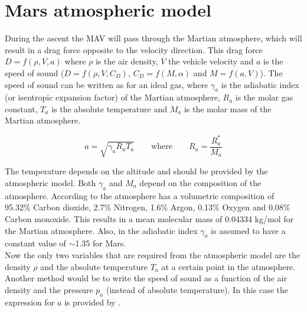 \chapter{Mars atmospheric model} %
\label{ch:mars-atm-mod}
During the ascent the \ac{MAV} will pass through the Martian atmosphere, which will result in a drag force opposite to the velocity direction. This drag force $D=f(\rho,V,a)$ where $\rho$ is the air density, $V$ the vehicle velocity and $a$ is the speed of sound ($D=f(\rho,V,C_{D})$, $C_{D}=f(M,\alpha)$ and $M=f(a,V)$). The speed of sound can be written as  for an ideal gas, where $\gamma_{a}$ is the adiabatic index (or isentropic expansion factor) of the Martian atmosphere, $R_{a}$ is the molar gas constant, $T_{a}$ is the absolute temperature and $M_{a}$ is the molar mass of the Martian atmosphere.


\begin{equation} \label{eq:speedofsound}
a=\sqrt{\gamma_{a}R_{a}T_{a}} \qquad \text{where} \qquad R_{a}=\dfrac{R^{*}_{a}}{M_{a}}
\end{equation}

The temperature depends on the altitude and should be provided by the atmospheric model. Both $\gamma_{a}$ and $M_{a}$ depend on the composition of the atmosphere.  According to \cite{williams2015} the atmosphere has a volumetric composition of 95.32\% Carbon dioxide, 2.7\% Nitrogen, 1.6\% Argon, 0.13\% Oxygen and 0.08\% Carbon monoxide. This results in a mean molecular mass of 0.04334 kg/mol for the Martian atmosphere. Also, in \cite{ho2002radio} the adiabatic index $\gamma_{a}$ is assumed to have a constant value of $\sim$1.35 for Mars.\\

Now the only two variables that are required from the atmospheric model are the density $\rho$ and the absolute temperature $T_{a}$ at a certain point in the atmosphere. Another method would be to write the speed of sound as a function of the air density and the pressure $p_{a}$ (instead of absolute temperature). In this case the expression for $a$ is provided by .  

